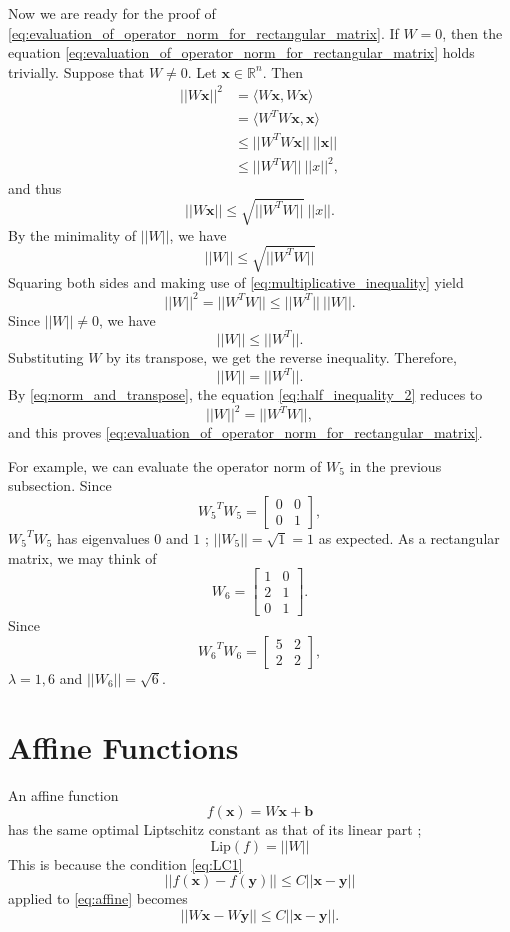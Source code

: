 \documentclass[12pt]{report}
\numberwithin{figure}{chapter}
\theoremstyle{plain}
\theoremstyle{definition}
\theoremstyle{corollary}
\theoremstyle{definition}
\theoremstyle{plain}
\theoremstyle{definition}
\theoremstyle{plain}
\newcommand\bx{\ensuremath{\boldsymbol x}}
\newcommand\by{\ensuremath{\boldsymbol y}}
\newcommand\bb{\ensuremath{\boldsymbol b}}
\newcommand\lip{\ensuremath{\text{Lip}}}
\begin{document}
Now we are ready for the proof of \eqref{eq:evaluation_of_operator_norm_for_rectangular_matrix}.
If \(W=0\), then the equation \eqref{eq:evaluation_of_operator_norm_for_rectangular_matrix} holds trivially.
Suppose that \(W\neq0\).
Let \(\bx\in\mathbb R^n\).
Then
\begin{align*}
||W\bx||^2
&=\langle W\bx,W\bx\rangle\\
&=\langle W^TW\bx,\bx\rangle\\
&\le||W^TW\bx||\:||\bx||\\
&\le||W^TW||\:||x||^2,
\end{align*}
and thus
\[||W\bx||\le\sqrt{||W^TW||}\:||x||.\]
By the minimality of \(||W||\), we have
\[||W||\le\sqrt{||W^TW||}\]
Squaring both sides and making use of \eqref{eq:multiplicative_inequality} yield
\begin{equation}\label{eq:half_inequality_2}
||W||^2=||W^TW||\le||W^T||\:||W||.
\end{equation}
Since \(||W||\neq0\), we have
\[||W||\le||W^T||.\]
Substituting \(W\) by its transpose, we get the reverse inequality.
Therefore,
\begin{equation}\label{eq:norm_and_transpose}
||W||=||W^T||.
\end{equation}
By \eqref{eq:norm_and_transpose}, the equation \eqref{eq:half_inequality_2} reduces to
\[||W||^2=||W^TW||,\]
and this proves \eqref{eq:evaluation_of_operator_norm_for_rectangular_matrix}.

For example, we can evaluate the operator norm of \(W_5\) in the previous subsection.
Since
\[{W_5}^TW_5=\begin{bmatrix}0&0\\0&1\end{bmatrix},\]
\({W_5}^TW_5\) has eigenvalues \(0\) and \(1\) ; \(||W_5||=\sqrt1=1\) as expected.
As a rectangular matrix, we may think of
\[W_6=\begin{bmatrix}1&0\\2&1\\0&1\end{bmatrix}.\]
Since
\[{W_6}^TW_6=\begin{bmatrix}5&2\\2&2\end{bmatrix},\]
\(\lambda=1,6\) and \(||W_6||=\sqrt6\).

\section{Affine Functions}
An affine function 
\begin{equation}\label{eq:affine}
f(\bx)=W\bx+\bb
\end{equation}
has the same optimal Liptschitz constant as that of its linear part ; 
\begin{equation}\label{eq:affine_OLC}
\lip(f)=||W||
\end{equation}
This is because the condition \eqref{eq:LC1} 
\[
||f(\bx)-f(\by)||\le C||\bx-\by||
\]
applied to \eqref{eq:affine} becomes
\[
||W\bx-W\by||\le C||\bx-\by||.
\]
\end{document}
